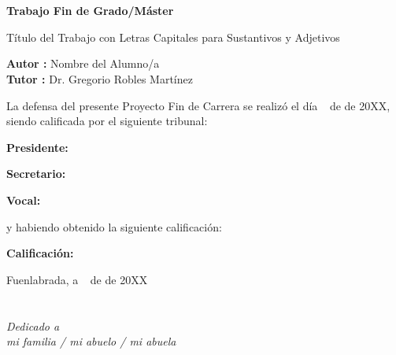 \documentclass[a4paper, 12pt]{book}
\begin{document}
\newpage
\mbox{}
\thispagestyle{empty} %


\clearpage
{}
\chapter*{}

\vspace{-4cm}
\begin{center}
\LARGE
\textbf{Trabajo Fin de Grado/Máster}

\vspace{1cm}
\large
Título del Trabajo con Letras Capitales para Sustantivos y Adjetivos

\vspace{1cm}
\large
\textbf{Autor :} Nombre del Alumno/a \\
\textbf{Tutor :} Dr. Gregorio Robles Martínez

\end{center}

\vspace{1cm}
La defensa del presente Proyecto Fin de Carrera se realizó el día \qquad$\;\,$ de \qquad\qquad\qquad\qquad \newline de 20XX, siendo calificada por el siguiente tribunal:


\vspace{0.5cm}
\textbf{Presidente:}

\vspace{1.2cm}
\textbf{Secretario:}

\vspace{1.2cm}
\textbf{Vocal:}


\vspace{1.2cm}
y habiendo obtenido la siguiente calificación:

\vspace{1cm}
\textbf{Calificación:}


\vspace{1cm}
\begin{flushright}
Fuenlabrada, a \qquad$\;\,$ de \qquad\qquad\qquad\qquad de 20XX
\end{flushright}


\chapter*{}
\begin{flushright}
\textit{Dedicado a \\
mi familia / mi abuelo / mi abuela}
\end{flushright}
\end{document}
